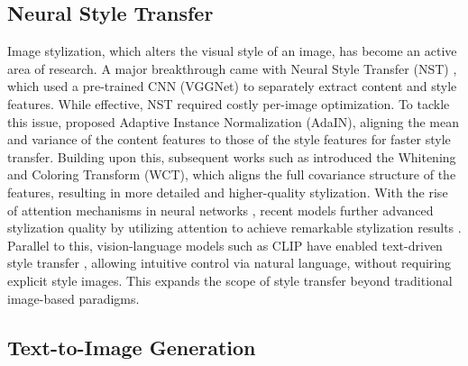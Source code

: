 \documentclass[10pt,twocolumn,letterpaper]{article}
\begin{document}
\subsection{Neural Style Transfer}
Image stylization, which alters the visual style of an image, has become an active area of research. A major breakthrough came with Neural Style Transfer (NST) \cite{gatys2016image}, which used a pre-trained CNN (VGGNet) to separately extract content and style features. While effective, NST required costly per-image optimization. To tackle this issue, \cite{huang2017arbitrary} proposed Adaptive Instance Normalization (AdaIN), aligning the mean and variance of the content features to those of the style features for faster style transfer. Building upon this, subsequent works such as \cite{li2017universal, lu2019closed} introduced the Whitening and Coloring Transform (WCT), which aligns the full covariance structure of the features, resulting in more detailed and higher-quality stylization.
With the rise of attention mechanisms in neural networks \cite{vaswani2017attention, dosovitskiy2020image}, recent models further advanced stylization quality by utilizing attention to achieve remarkable stylization results \cite{liu2021adaattn, hong2023aespa, deng2020arbitrary, park2019arbitrary, yao2019attention, gim2024content}. 
Parallel to this, vision-language models such as CLIP \cite{radford2021learning} have enabled text-driven style transfer \cite{park2025styleeditortextdrivenobjectcentricstyle, kwon2022clipstyler,bar2022text2live}, allowing intuitive control via natural language, without requiring explicit style images. This expands the scope of style transfer beyond traditional image-based paradigms.




\subsection{Text-to-Image Generation}
\end{document}
